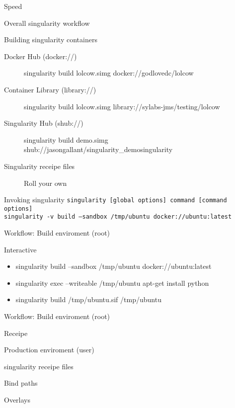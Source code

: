 \documentclass{beamer}
\begin{document}
  \begin{frame}{Speed}

  \end{frame}

  \begin{frame}{Overall singularity workflow}
    
  \end{frame}

  \begin{frame}{Building singularity containers}
    \begin{description}
      \item[Docker Hub (docker://)] singularity build lolcow.simg docker://godlovedc/lolcow
      \item[Container Library (library://)] singularity build lolcow.simg library://sylabs-jms/testing/lolcow
      \item[Singularity Hub (shub://)] singularity build demo.simg shub://jasongallant/singularity\_demosingularity
      \item[Singularity receipe files] Roll your own
    \end{description}
  \end{frame}

  \begin{frame}{Invoking singularity}
    \footnotesize
    \texttt{singularity [global options] command [command options]}\\
    \texttt{singularity -v build --sandbox /tmp/ubuntu docker://ubuntu:latest}
  \end{frame}

  \begin{frame}{Workflow: Build enviroment (root)}
        \begin{block}{Interactive}
          \begin{itemize}
            \item singularity build --sandbox /tmp/ubuntu docker://ubuntu:latest
            \item singularity exec --writeable /tmp/ubuntu apt-get install python
            \item singularity build /tmp/ubuntu.sif /tmp/ubuntu
          \end{itemize}
        \end{block}
  \end{frame}
  \begin{frame}{Workflow: Build enviroment (root)}
    \begin{block}{Receipe}

    \end{block}
  \end{frame}
  \begin{frame}
    \begin{block}{Production enviroment (user)}

    \end{block}
  \end{frame}




  \begin{frame}{singularity receipe files}
  \end{frame}

  \begin{frame}{Bind paths}

  \end{frame}

  \begin{frame}{Overlays}
  \end{frame}
\end{document}
